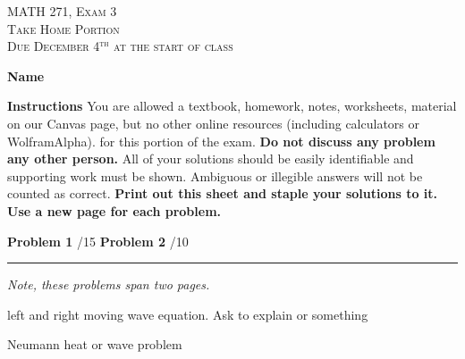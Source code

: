 \documentclass[12pt]{amsbook}
\begin{document}

\begin{center}
   \textsc{\large MATH 271, Exam 3}\\
   \textsc{Take Home Portion}\\
   \textsc{Due December 4$^\textrm{th}$ at the start of class}
\end{center}
\vspace{1cm}

\noindent\textbf{Name} \; \underline{\hspace{8cm}}

\vspace{1cm}

\noindent\textbf{Instructions} \; You are allowed a textbook, homework, notes, worksheets, material on our Canvas page, but no other online resources (including calculators or WolframAlpha). for this portion of the exam.  \textbf{Do not discuss any problem any other person.} All of your solutions should be easily identifiable and supporting work must be shown.  Ambiguous or illegible answers will not be counted as correct. \textbf{Print out this sheet and staple your solutions to it. Use a new page for each problem.}


\vspace{1cm}

\begin{center}\textbf{Problem 1} \; \underline{\hspace{1cm}}/15 \qquad \qquad \textbf{Problem 2} \; \underline{\hspace{1cm}}/10\end{center}

\vspace{1cm}

\hrule

\vspace*{1cm}
\noindent\emph{Note, these problems span two pages.}

\newpage
\begin{problem}
left and right moving wave equation.  Ask to explain or something
\end{problem}

\newpage
\begin{problem}
Neumann heat or wave problem
\end{problem}
\end{document}
